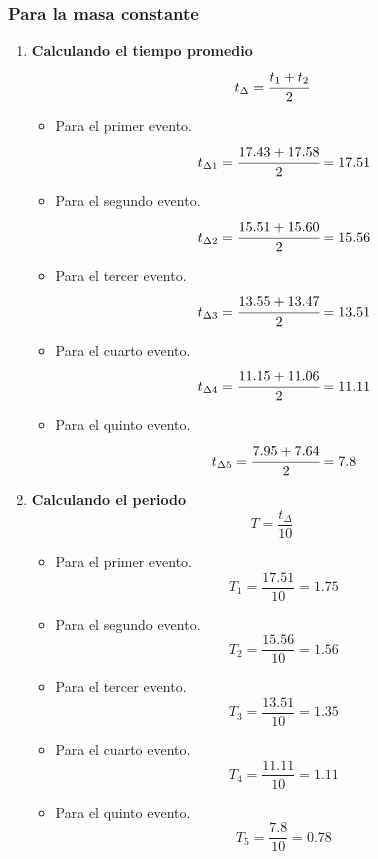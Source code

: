 \subsubsection{Para la masa constante}
\begin{enumerate}[label=\bfseries\alph*.-,itemsep=2pt]
	\item \textbf{Calculando el tiempo promedio}
	      \[t_\Delta = \cfrac{t_1+t_2}{2}\]
	      \begin{itemize}[label=\textbf{$\bullet$},itemsep=2pt,partopsep=6pt,parsep=6pt]
		      \item Para el primer  evento.
		            \[t_{\Delta{1}}=\cfrac{17.43+17.58}{2}=17.51\]
		      \item Para el segundo evento.
		            \[t_{\Delta{2}}=\cfrac{15.51+15.60}{2}=15.56\]
		      \item Para el tercer  evento.
		            \[t_{\Delta{3}}=\cfrac{13.55+13.47}{2}=13.51\]
		      \item Para el cuarto  evento.
		            \[t_{\Delta{4}}=\cfrac{11.15+11.06}{2}=11.11\]
		      \item Para el quinto  evento.
		            \[t_{\Delta{5}}=\cfrac{7.95+7.64}{2}=7.8\]
	      \end{itemize}

	\item \textbf{Calculando el periodo}
	      \[T = \dfrac{t_\Delta}{10}\]
	      \begin{itemize}[label=\textbf{$\bullet$},itemsep=2pt,partopsep=6pt,parsep=6pt]
		      \item Para el primer evento.
		            \[T_1 = \dfrac{17.51}{10}=1.75\]
		      \item Para el segundo evento.
		            \[T_2 = \dfrac{15.56}{10}=1.56\]
		      \item Para el tercer evento.
		            \[T_3 = \dfrac{13.51}{10}=1.35\]
		      \item Para el cuarto evento.
		            \[T_4 = \dfrac{11.11}{10}=1.11\]
		      \item Para el quinto evento.
		            \[T_5 = \dfrac{7.8}{10}=0.78\]
	      \end{itemize}


\end{enumerate}
